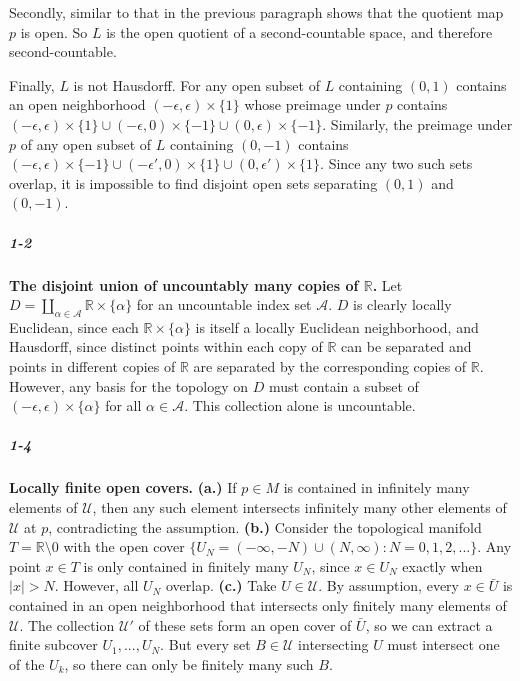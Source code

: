 \documentclass[10pt,letter]{article}
\begin{document}
Secondly, similar to that in the previous paragraph shows that the quotient map $p$ is open. So $L$ is the open quotient of a second-countable space, and therefore second-countable.

Finally, $L$ is not Hausdorff. For any open subset of $L$ containing $(0,1)$ contains an open neighborhood $(-\epsilon,\epsilon) \times \lbrace 1 \rbrace$ whose preimage under $p$ contains $(-\epsilon,\epsilon) \times \lbrace 1 \rbrace \cup (-\epsilon,0) \times \lbrace -1 \rbrace \cup (0,\epsilon) \times \lbrace -1 \rbrace$. Similarly, the preimage under $p$ of any open subset of $L$ containing $(0,-1)$ contains $(-\epsilon,\epsilon) \times \lbrace -1 \rbrace \cup(-\epsilon',0) \times \lbrace 1 \rbrace \cup (0,\epsilon') \times \lbrace 1 \rbrace$. Since any two such sets overlap, it is impossible to find disjoint open sets separating $(0,1)$ and $(0,-1)$.

\subparagraph{1-2} \textbf{The disjoint union of uncountably many copies of $\mathbb{R}$.} Let $D = \coprod \limits_{\alpha \in \mathcal{A}} \mathbb{R} \times \lbrace \alpha \rbrace$ for an uncountable index set $\mathcal{A}$. $D$ is clearly locally Euclidean, since each $\mathbb{R} \times \lbrace \alpha \rbrace$ is itself a locally Euclidean neighborhood, and Hausdorff, since distinct points within each copy of $\mathbb{R}$ can be separated and points in different copies of $\mathbb{R}$ are separated by the corresponding copies of $\mathbb{R}$. However, any basis for the topology on $D$ must contain a subset of $(-\epsilon,\epsilon) \times \lbrace \alpha \rbrace$ for all $\alpha \in \mathcal{A}$. This collection alone is uncountable. 

\subparagraph{1-4} \textbf{Locally finite open covers.} \textbf{(a.)} If $p \in M$ is contained in infinitely many elements of $\mathcal{U}$, then any such element intersects infinitely many other elements of $\mathcal{U}$ at $p$, contradicting the assumption. \textbf{(b.)} Consider the topological manifold $T = \mathbb{R} \setminus 0$ with the open cover $\lbrace U_N = (-\infty,-N) \cup (N,\infty): N = 0,1,2,... \rbrace$. Any point $x \in T$ is only contained in finitely many $U_N$, since $x \in U_N$ exactly when $\vert x \vert > N$. However, all $U_N$ overlap. \textbf{(c.)}  Take $U \in \mathcal{U}$. By assumption, every $x \in \bar{U}$ is contained in an open neighborhood that intersects only finitely many elements of $\mathcal{U}$. The collection $\mathcal{U}'$ of these sets form an open cover of $\bar{U}$, so we can extract a finite subcover $U_1,...,U_N$. But every set $B \in \mathcal{U}$ intersecting $U$ must intersect one of the $U_k$, so there can only be finitely many such $B$.
\end{document}
